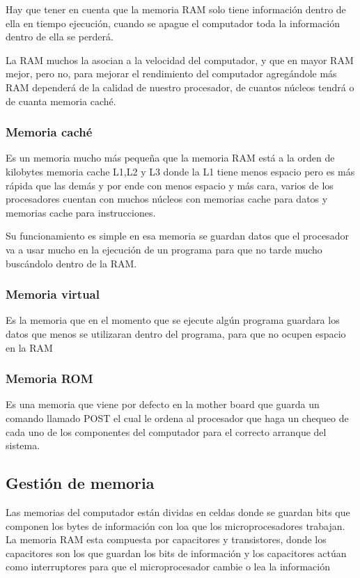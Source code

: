 \documentclass{article}
\begin{document}
Hay que tener en cuenta que la memoria RAM solo tiene información dentro de ella en tiempo ejecución, cuando se apague el computador toda la información dentro de ella se perderá.

La RAM muchos la asocian a la velocidad del computador, y que en mayor RAM mejor, pero no, para mejorar el rendimiento del computador agregándole más RAM dependerá de la calidad de nuestro procesador, de cuantos núcleos tendrá o de cuanta memoria caché.

\subsubsection{Memoria caché}

Es un memoria mucho más pequeña que la memoria RAM está a la orden de kilobytes memoria cache L1,L2 y L3 donde la L1 tiene menos espacio pero es más rápida que las demás y por ende con menos espacio y más cara, varios de los procesadores cuentan con muchos núcleos con memorias cache para datos y memorias cache para instrucciones.

\vspace{10pt}

Su funcionamiento es simple en esa memoria se guardan datos que el procesador va a usar mucho en la ejecución de un programa para que no tarde mucho buscándolo dentro de la RAM.
\subsubsection{Memoria virtual}

Es la memoria que en el momento que se ejecute algún programa guardara los datos que menos se utilizaran dentro del programa, para que no ocupen espacio en la RAM

\subsubsection{Memoria ROM}
Es una memoria  que viene por defecto en la mother board que guarda un comando llamado POST el cual le ordena al procesador que haga un chequeo de cada uno de los componentes del computador para el correcto arranque del sistema.\cite{referencia}
\subsection{Gestión de memoria}

Las memorias del computador están dividas en celdas donde se guardan bits que componen los bytes de información con loa que los microprocesadores trabajan.
	La memoria RAM esta compuesta por capacitores  y transistores, donde los capacitores son los que guardan los bits de información  y los capacitores actúan como interruptores para que el microprocesador cambie o lea la información 
\end{document}
